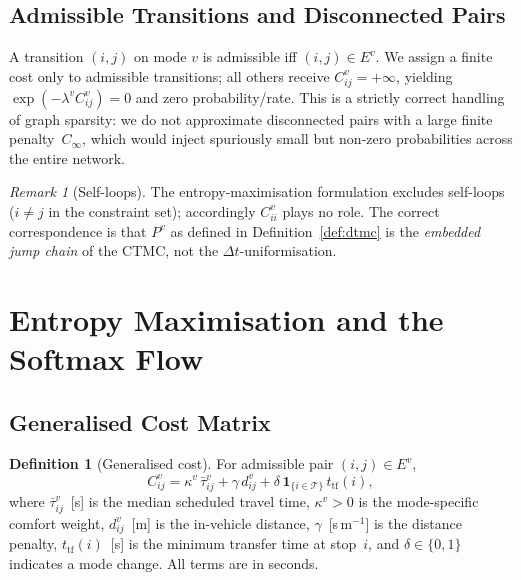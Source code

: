 \documentclass[11pt,a4paper]{article}
\theoremstyle{plain}
\theoremstyle{definition}
\newtheorem{definition}[theorem]{Definition}
\theoremstyle{remark}
\newtheorem{remark}[theorem]{Remark}
\begin{document}
\subsection{Admissible Transitions and Disconnected Pairs}

A transition $(i,j)$ on mode $v$ is admissible iff $(i,j)\in E^v$.  We assign
a finite cost only to admissible transitions; all others receive
$C^v_{ij}=+\infty$, yielding $\exp(-\lambda^v C^v_{ij})=0$ and zero
probability/rate.  This is a strictly correct handling of graph sparsity: we do
not approximate disconnected pairs with a large finite penalty~$C_\infty$,
which would inject spuriously small but non-zero probabilities across the entire
network.

\begin{remark}[Self-loops]
The entropy-maximisation formulation excludes self-loops ($i\ne j$ in the
constraint set); accordingly $C^v_{ii}$ plays no role.  The correct
correspondence is that $P^v$ as defined in Definition~\ref{def:dtmc} is the
\emph{embedded jump chain} of the CTMC, not the $\Delta t$-uniformisation.
\end{remark}

\section{Entropy Maximisation and the Softmax Flow}
\label{sec:entropy}

\subsection{Generalised Cost Matrix}

\begin{definition}[Generalised cost]
For admissible pair $(i,j)\in E^v$,
\begin{equation}
  C^v_{ij} = \kappa^v\,\bar\tau^v_{ij} + \gamma\,d^v_{ij}
              + \delta\,\mathbf{1}_{\{i\in\mathcal{T}\}}\,t_{\mathrm{tf}}(i),
  \label{eq:cost}
\end{equation}
where $\bar\tau^v_{ij}$~[s] is the median scheduled travel time,
$\kappa^v>0$ is the mode-specific comfort weight,
$d^v_{ij}$~[m] is the in-vehicle distance,
$\gamma$~[s\,m$^{-1}$] is the distance penalty,
$t_{\mathrm{tf}}(i)$~[s] is the minimum transfer time at stop~$i$,
and $\delta\in\{0,1\}$ indicates a mode change.  All terms are in seconds.
\end{definition}
\end{document}
